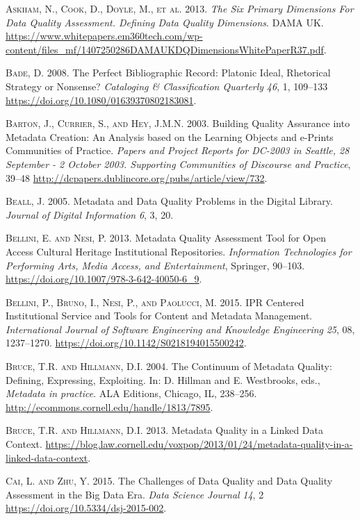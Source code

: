 \textsc{Askham, N., Cook, D., Doyle, M., et al.} 2013. \emph{The Six Primary Dimensions For Data Quality Assessment. Defining Data Quality Dimensions}. DAMA UK. \url{https://www.whitepapers.em360tech.com/wp-content/files_mf/1407250286DAMAUKDQDimensionsWhitePaperR37.pdf}.

\textsc{Bade, D.} 2008. The Perfect Bibliographic Record: Platonic Ideal, Rhetorical Strategy or Nonsense? \emph{Cataloging \& Classification Quarterly} \emph{46}, 1, 109–133 \url{https://doi.org/10.1080/01639370802183081}.

\textsc{Barton, J., Currier, S., and Hey, J.M.N.} 2003. Building Quality Assurance into Metadata Creation: An Analysis based on the Learning Objects and e-Prints Communities of Practice. \emph{Papers and Project Reports for DC-2003 in Seattle, 28 September - 2 October 2003. Supporting Communities of Discourse and Practice}, 39–48 \url{http://dcpapers.dublincore.org/pubs/article/view/732}.

\textsc{Beall, J.} 2005. Metadata and Data Quality Problems in the Digital Library. \emph{Journal of Digital Information} \emph{6}, 3, 20.

\textsc{Bellini, E. and Nesi, P.} 2013. Metadata Quality Assessment Tool for Open Access Cultural Heritage Institutional Repositories. \emph{Information Technologies for Performing Arts, Media Access, and Entertainment}, Springer, 90–103. \url{https://doi.org/10.1007/978-3-642-40050-6_9}.

\textsc{Bellini, P., Bruno, I., Nesi, P., and Paolucci, M.} 2015. IPR Centered Institutional Service and Tools for Content and Metadata Management. \emph{International Journal of Software Engineering and Knowledge Engineering} \emph{25}, 08, 1237–1270. \url{https://doi.org/10.1142/S0218194015500242}.

\textsc{Bruce, T.R. and Hillmann, D.I.} 2004. The Continuum of Metadata Quality: Defining, Expressing, Exploiting. In: D. Hillman and E. Westbrooks, eds., \emph{Metadata in practice}. ALA Editions, Chicago, IL, 238–256.  \url{http://ecommons.cornell.edu/handle/1813/7895}.

\textsc{Bruce, T.R. and Hillmann, D.I.} 2013. Metadata Quality in a Linked Data Context. \url{https://blog.law.cornell.edu/voxpop/2013/01/24/metadata-quality-in-a-linked-data-context}.

\textsc{Cai, L. and Zhu, Y.} 2015. The Challenges of Data Quality and Data Quality Assessment in the Big Data Era. \emph{Data Science Journal} \emph{14}, 2 \url{https://doi.org/10.5334/dsj-2015-002}.

